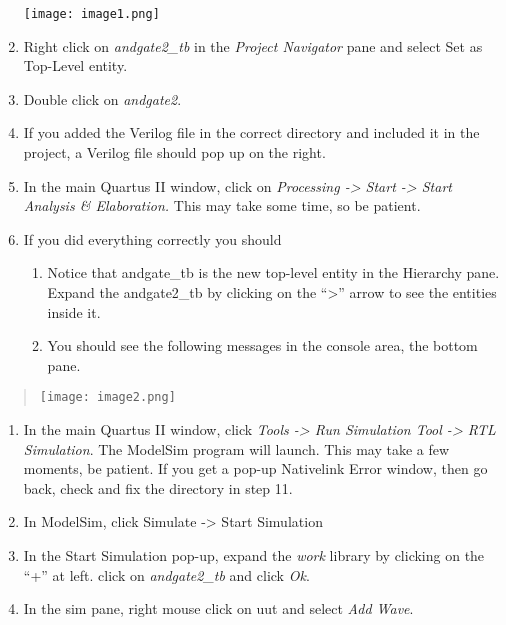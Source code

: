 \begin{enumerate}
        \texttt{[image: image1.png]}

    \item
        Right click on \emph{andgate2\_tb} in the \emph{Project Navigator}
        pane and select Set as Top-Level entity.
    \item
        Double click on \emph{andgate2}.
    \item
        If you added the Verilog file in the correct directory and included it
        in the project, a Verilog file should pop up on the right.
    \item
        In the main Quartus II window, click on \emph{Processing
        -\textgreater{} Start -\textgreater{} Start Analysis \& Elaboration.}
        This may take some time, so be patient.
    \item
        If you did everything correctly you should

        \begin{enumerate}
                \def\labelenumii{\alph{enumii}.}
            \item
                Notice that andgate\_tb is the new top-level entity in the Hierarchy
                pane. Expand the andgate2\_tb by clicking on the ``\textgreater''
                arrow to see the entities inside it.
            \item
                You should see the following messages in the console area, the
                bottom pane.
        \end{enumerate}
\end{enumerate}

\begin{quote}
    \texttt{[image: image2.png]}
\end{quote}

\begin{enumerate}
        \def\labelenumi{\arabic{enumi}.}
        \setcounter{enumi}{17}
    \item
        In the main Quartus II window, click \emph{Tools -\textgreater{} Run
        Simulation Tool -\textgreater{} RTL Simulation}. The ModelSim program
        will launch. This may take a few moments, be patient. If you get a
        pop-up Nativelink Error window, then go back, check and fix the
        directory in step 11.
    \item
        In ModelSim, click Simulate -\textgreater{} Start Simulation
    \item
        In the Start Simulation pop-up, expand the \emph{work} library by
        clicking on the ``+'' at left. click on \emph{andgate2\_tb} and click
        \emph{Ok}.
    \item
        In the sim pane, right mouse click on uut and select \emph{Add Wave}.
\end{enumerate}

